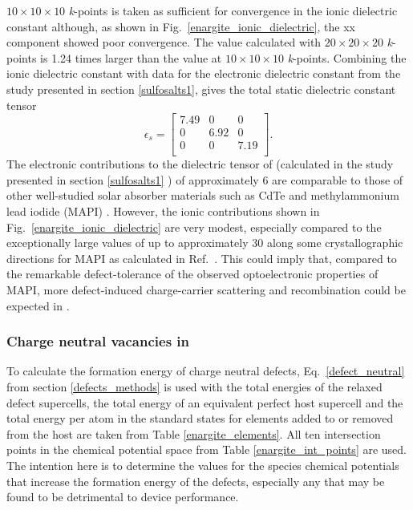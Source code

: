 \documentclass[11pt, twoside]{report}
\begin{document}

$10\times10\times10$ \textit{k}-points is taken as sufficient for convergence in the ionic dielectric constant although, as shown in Fig.~\ref{enargite_ionic_dielectric}, the xx component showed poor convergence. The value calculated with $20\times20\times20$ \textit{k}-points is 1.24 times larger than the value at $10\times10\times10$ \textit{k}-points. Combining the ionic dielectric constant with data for the electronic dielectric constant from the study presented in section \ref{sulfosalts1}, gives the total static dielectric constant tensor
\begin{equation}\label{dielectric_tensor}
\epsilon_s = 
\begin{bmatrix}
7.49 & 0 & 0 \\
0 & 6.92 & 0 \\
0 & 0 & 7.19 \\
\end{bmatrix}.
\end{equation}
The electronic contributions to the dielectric tensor of {\enargite} (calculated in the study presented in section \ref{sulfosalts1} \cite{sulfosalts_paper}) of approximately 6 are comparable to those of other well-studied solar absorber materials such as CdTe and methylammonium lead iodide (MAPI) \cite{Federico}. However, the ionic contributions shown in Fig.~\ref{enargite_ionic_dielectric} are very modest, especially compared to the exceptionally large values of up to approximately 30 along some crystallographic directions for MAPI as calculated in Ref.~. This could imply that, compared to the remarkable defect-tolerance of the observed optoelectronic properties of MAPI, more defect-induced charge-carrier scattering and recombination could be expected in {\enargite}.

\subsubsection{Charge neutral vacancies in {\enargite}}
To calculate the formation energy of charge neutral defects, Eq.~\ref{defect_neutral} from section \ref{defects_methods} is used with the total energies of the relaxed defect supercells, the total energy of an equivalent perfect host supercell and the total energy per atom in the standard states for elements added to or removed from the host are taken from Table \ref{enargite_elements}. All ten intersection points in the chemical potential space from Table \ref{enargite_int_points} are used. The intention here is to determine the values for the species chemical potentials that increase the formation energy of the defects, especially any that may be found to be detrimental to device performance.
\end{document}
